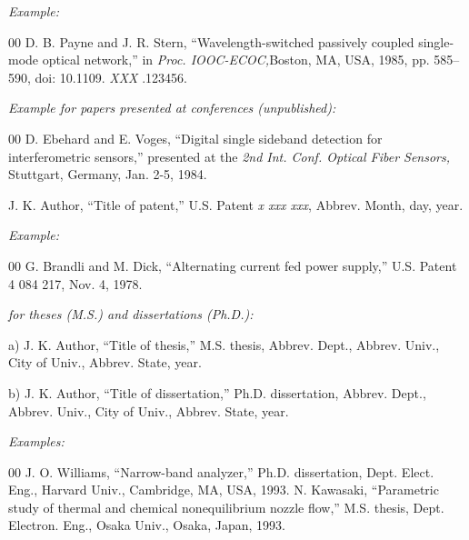 \documentclass[journal,onecolumn,web]{ieeecolor}
\begin{document}
{\it Example:}{\vadjust{\vspace*{-2.5em}}}

\begin{thebibliography}{00}
 D. B. Payne and J. R. Stern, ``Wavelength-switched passively coupled single-mode optical network,'' in {\it Proc. IOOC-ECOC,}Boston, MA, USA,  1985,
pp. 585--590, doi:  {10.1109.} {{\it XXX}} {.123456}.
\end{thebibliography}

{\it Example for papers presented at conferences (unpublished):}{\vadjust{\vspace*{-2.5em}}}

\begin{thebibliography}{00}
 D. Ebehard and E. Voges, ``Digital single sideband detection for interferometric sensors,'' presented at the {\it 2nd Int. Conf. Optical Fiber Sensors,} Stuttgart, Germany, Jan. 2-5, 1984.
\end{thebibliography}


\noindent J. K. Author, ``Title of patent,'' U.S. Patent {\it x xxx xxx}, Abbrev. Month, day, year.

{\it Example:}{\vadjust{\vspace*{-2.5em}}}

\begin{thebibliography}{00}
 G. Brandli and M. Dick, ``Alternating current fed power supply,'' U.S. Patent 4 084 217, Nov. 4, 1978.
\end{thebibliography}

 {\it for theses (M.S.) and dissertations (Ph.D.):}

\noindent a) J. K. Author, ``Title of thesis,'' M.S. thesis, Abbrev. Dept., Abbrev.
Univ., City of Univ., Abbrev. State, year.

\noindent b) J. K. Author, ``Title of dissertation,'' Ph.D. dissertation, Abbrev.
Dept., Abbrev. Univ., City of Univ., Abbrev. State, year.

{\it Examples:}{\vadjust{\vspace*{-2.5em}}}

\begin{thebibliography}{00}
 J. O. Williams, ``Narrow-band analyzer,'' Ph.D. dissertation, Dept. Elect. Eng., Harvard Univ., Cambridge, MA, USA, 1993.
 N. Kawasaki, ``Parametric study of thermal and chemical nonequilibrium nozzle flow,'' M.S. thesis, Dept. Electron. Eng., Osaka Univ., Osaka, Japan, 1993.
\end{thebibliography}
\end{document}
